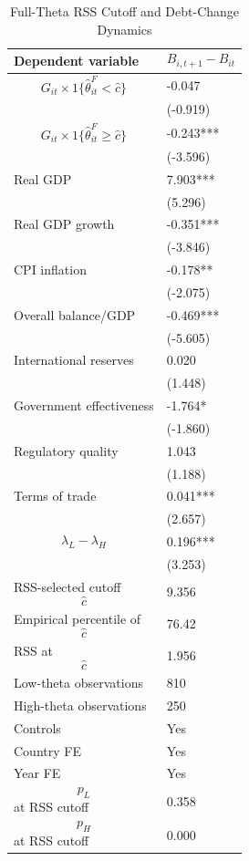\begin{table}[H]\centering
\begin{threeparttable}
\caption{Full-Theta RSS Cutoff and Debt-Change Dynamics}
\label{tab:deltaB_rss_cutoff_fulltheta}
\scriptsize
\begin{tabularx}{\textwidth}{lY}
\toprule
Dependent variable & $$B_{i,t+1}-B_{it}$$ \\
\midrule
$$G_{it}\times 1\{\widehat{\theta}^{F}_{it}<\widehat{c}\}$$ & -0.047 \\
 & (-0.919) \\
$$G_{it}\times 1\{\widehat{\theta}^{F}_{it}\geq\widehat{c}\}$$ & -0.243*** \\
 & (-3.596) \\
Real GDP & 7.903*** \\
 & (5.296) \\
Real GDP growth & -0.351*** \\
 & (-3.846) \\
CPI inflation & -0.178** \\
 & (-2.075) \\
Overall balance/GDP & -0.469*** \\
 & (-5.605) \\
International reserves & 0.020 \\
 & (1.448) \\
Government effectiveness & -1.764* \\
 & (-1.860) \\
Regulatory quality & 1.043 \\
 & (1.188) \\
Terms of trade & 0.041*** \\
 & (2.657) \\
$$\lambda_L-\lambda_H$$ & 0.196*** \\
 & (3.253) \\
\midrule
RSS-selected cutoff $$\widehat{c}$$ & 9.356 \\
Empirical percentile of $$\widehat{c}$$ & 76.42 \\
RSS at $$\widehat{c}$$ & 1.956 \\
Low-theta observations & 810 \\
High-theta observations & 250 \\
Controls & Yes \\
Country FE & Yes \\
Year FE & Yes \\
$$p_L$$ at RSS cutoff & 0.358 \\
$$p_H$$ at RSS cutoff & 0.000 \\

\end{tabularx}
\end{threeparttable}
\end{table}

